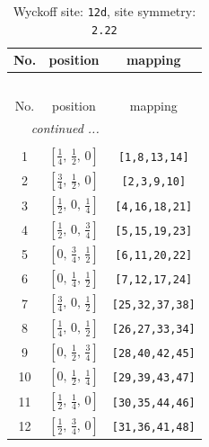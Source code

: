 \documentclass[fleqn,8pt]{jsarticle}
\begin{document}
\begin{longtable}{ccc}
\caption{Wyckoff site: {\tt 12d}, site symmetry: {\tt 2.22}}
 \\
 \hline \hline
No. & position & mapping \\ \hline \endfirsthead

\multicolumn{2}{l}{\tablename\ \thetable{}} \\
 \hline \hline
No. & position & mapping \\ \hline \endhead

 \hline \hline
\multicolumn{2}{r}{\footnotesize\it continued ...} \\ \endfoot

 \hline \hline
\multicolumn{2}{r}{} \\ \endlastfoot

1 & $\left[ \frac{1}{4},\, \frac{1}{2},\, 0 \right]$ & {\tt [1,8,13,14]} \\ \hline
2 & $\left[ \frac{3}{4},\, \frac{1}{2},\, 0 \right]$ & {\tt [2,3,9,10]} \\ \hline
3 & $\left[ \frac{1}{2},\, 0,\, \frac{1}{4} \right]$ & {\tt [4,16,18,21]} \\ \hline
4 & $\left[ \frac{1}{2},\, 0,\, \frac{3}{4} \right]$ & {\tt [5,15,19,23]} \\ \hline
5 & $\left[ 0,\, \frac{3}{4},\, \frac{1}{2} \right]$ & {\tt [6,11,20,22]} \\ \hline
6 & $\left[ 0,\, \frac{1}{4},\, \frac{1}{2} \right]$ & {\tt [7,12,17,24]} \\ \hline
7 & $\left[ \frac{3}{4},\, 0,\, \frac{1}{2} \right]$ & {\tt [25,32,37,38]} \\ \hline
8 & $\left[ \frac{1}{4},\, 0,\, \frac{1}{2} \right]$ & {\tt [26,27,33,34]} \\ \hline
9 & $\left[ 0,\, \frac{1}{2},\, \frac{3}{4} \right]$ & {\tt [28,40,42,45]} \\ \hline
10 & $\left[ 0,\, \frac{1}{2},\, \frac{1}{4} \right]$ & {\tt [29,39,43,47]} \\ \hline
11 & $\left[ \frac{1}{2},\, \frac{1}{4},\, 0 \right]$ & {\tt [30,35,44,46]} \\ \hline
12 & $\left[ \frac{1}{2},\, \frac{3}{4},\, 0 \right]$ & {\tt [31,36,41,48]} \\
\end{longtable}
\renewcommand{\arraystretch}{1.2}
\end{document}

